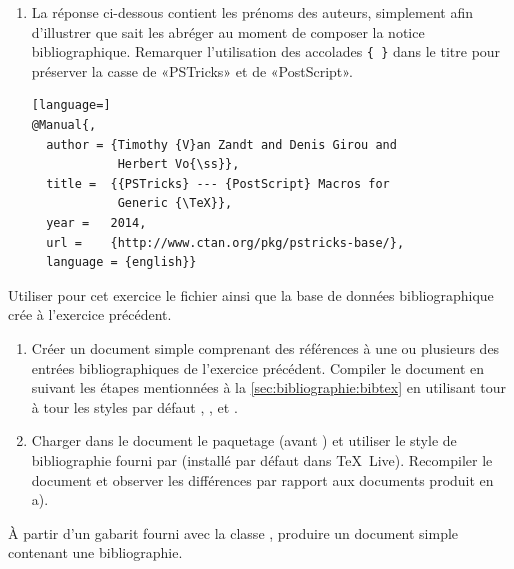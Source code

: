 \begin{exercice}
\begin{sol}
\begin{enumerate}
    \item La réponse ci-dessous contient les prénoms des auteurs,
      simplement afin d'illustrer que {\BibTeX} sait les abréger au
      moment de composer la notice bibliographique. Remarquer
      l'utilisation des accolades \verb={ }= dans le titre pour
      préserver la casse de «PSTricks» et de «PostScript».
\begin{lstlisting}[language=]
@Manual{,
  author = {Timothy {V}an Zandt and Denis Girou and
            Herbert Vo{\ss}},
  title =  {{PSTricks} --- {PostScript} Macros for
            Generic {\TeX}},
  year =   2014,
  url =    {http://www.ctan.org/pkg/pstricks-base/},
  language = {english}}
\end{lstlisting}
    \end{enumerate}
  \end{sol}
\end{exercice}

\begin{exercice}[nosol]
  Utiliser pour cet exercice le fichier
   ainsi que la base de données
  bibliographique crée à l'exercice précédent.
  \begin{enumerate}
  \item Créer un document simple comprenant des références à une ou
    plusieurs des entrées bibliographiques de l'exercice précédent.
    Compiler le document en suivant les étapes mentionnées à la
    \autoref{sec:bibliographie:bibtex} en utilisant tour à tour les
    styles par défaut , ,  et
    .
  \item Charger dans le document le paquetage  (avant
    ) et utiliser le style de bibliographie 
    fourni par  (installé par défaut dans
    {\TeX}~Live). Recompiler le document et observer les différences
    par rapport aux documents produit en a).
  \end{enumerate}
\end{exercice}

\begin{exercice}[nosol]
  À partir d'un gabarit fourni avec la classe ,
  produire un document simple contenant une bibliographie.
\end{exercice}


